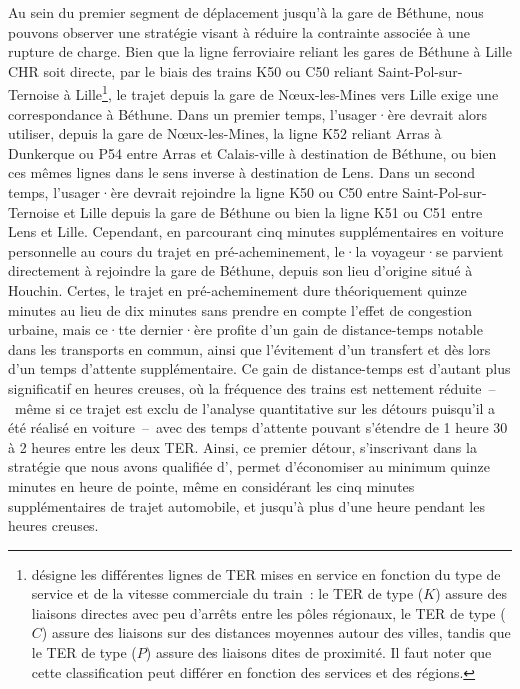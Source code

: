 \begin{refsegment}
Au sein du premier segment de déplacement jusqu'à la gare de Béthune, nous pouvons observer une stratégie visant à réduire la contrainte associée à une rupture de charge. Bien que la ligne ferroviaire reliant les gares de Béthune à Lille CHR soit directe, par le biais des trains K50 ou C50 reliant Saint-Pol-sur-Ternoise à Lille\footnote{
    \textcolor{blue}{\textcite[468]{sncf_voyageurs_trains_nodate}} désigne les différentes lignes de \acrshort{TER} mises en service en fonction du type de service et de la vitesse commerciale du train~: le \acrshort{TER} de type  (\(K\)) assure des liaisons directes avec peu d'arrêts entre les pôles régionaux, le \acrshort{TER} de type  (\(C\)) assure des liaisons sur des distances moyennes autour des villes, tandis que le \acrshort{TER} de type  (\(P\)) assure des liaisons dites de proximité. Il faut noter que cette classification peut différer en fonction des services et des régions.
}, le trajet depuis la gare de Nœux-les-Mines vers Lille exige une correspondance à Béthune. Dans un premier temps, l'usager·ère devrait alors utiliser, depuis la gare de Nœux-les-Mines, la ligne K52 reliant Arras à Dunkerque ou P54 entre Arras et Calais-ville à destination de Béthune, ou bien ces mêmes lignes dans le sens inverse à destination de Lens. Dans un second temps, l'usager·ère devrait rejoindre la ligne K50 ou C50 entre Saint-Pol-sur-Ternoise et Lille depuis la gare de Béthune ou bien la ligne K51 ou C51 entre Lens et Lille. Cependant, en parcourant cinq minutes supplémentaires en voiture personnelle au cours du trajet en pré-acheminement, le·la voyageur·se parvient directement à rejoindre la gare de Béthune, depuis son lieu d'origine situé à Houchin. Certes, le trajet en pré-acheminement dure théoriquement quinze minutes au lieu de dix minutes sans prendre en compte l'effet de congestion urbaine, mais ce·tte dernier·ère profite d'un gain de distance-temps notable dans les transports en commun, ainsi que l'évitement d'un transfert et dès lors d'un temps d'attente supplémentaire. Ce gain de distance-temps est d'autant plus significatif en heures creuses, où la fréquence des trains est nettement réduite~–~même si ce trajet est exclu de l'analyse quantitative sur les détours puisqu'il a été réalisé en voiture~–~avec des temps d'attente pouvant s'étendre de 1 heure 30 à 2 heures entre les deux \acrshort{TER}. Ainsi, ce premier détour, s'inscrivant dans la stratégie que nous avons qualifiée d', permet d'économiser au minimum quinze minutes en heure de pointe, même en considérant les cinq minutes supplémentaires de trajet automobile, et jusqu'à plus d'une heure pendant les heures creuses.%


\end{refsegment}
